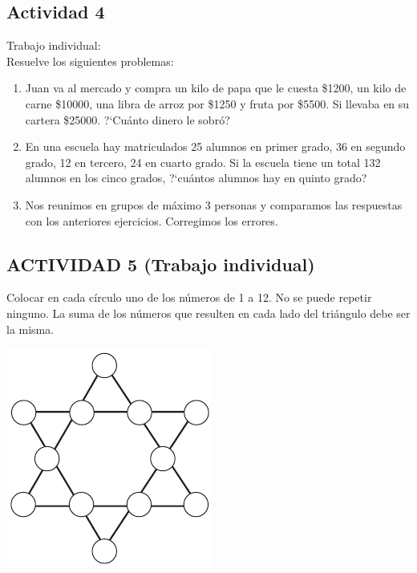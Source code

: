 \documentclass[10pt,twoside]{article}
\begin{document}
\subsection*{Actividad 4}
Trabajo individual:\\
Resuelve los siguientes problemas:
\begin{enumerate}
 \item Juan va al mercado y compra un kilo de papa que le cuesta \$1200, un kilo de carne \$10000, una libra de arroz por \$1250 y fruta por \$5500. Si llevaba en su cartera \$25000. ?`Cu\'anto dinero le sobr\'o?
\item En una escuela hay matriculados 25 alumnos en primer grado, 36 en segundo grado, 12 en tercero, 24 en cuarto grado. Si la escuela tiene un total 132 alumnos en los cinco grados, ?`cu\'antos alumnos hay en quinto grado?
\item Nos reunimos en grupos de m\'aximo 3 personas y comparamos las respuestas con los anteriores ejercicios. Corregimos los errores.
\end{enumerate}
\subsection*{ACTIVIDAD 5 (Trabajo individual)}
Colocar en cada c\'irculo uno de los n\'umeros de 1 a 12. No se puede repetir ninguno. La suma de los n\'umeros que resulten en cada lado del tri\'angulo debe ser la misma.
\begin{center}
 \includegraphics{Images/estrella.png}
\end{center}
\end{document}

